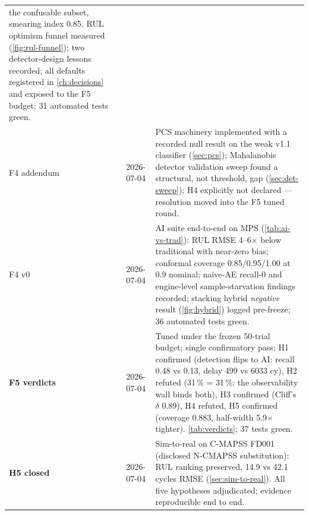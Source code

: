 \begin{table}[htbp]
\begin{tabular}{lp{}p{}}
      the confusable subset, smearing index 0.85, RUL optimism funnel measured
      (\cref{fig:rul-funnel}); two detector-design lessons recorded; all defaults registered
      in \cref{ch:decisions} and exposed to the F5 budget; 31 automated tests green. \\
    F4 addendum & 2026-07-04 & PCS machinery implemented with a
      recorded null result on the weak v1.1 classifier (\cref{sec:pcs}); Mahalanobis
      detector validation sweep found a structural, not threshold, gap
      (\cref{sec:det-sweep}); H4 explicitly not declared --- resolution moved into the F5
      tuned round. \\
    F4 v0 & 2026-07-04 & AI suite end-to-end on MPS (\cref{tab:ai-vs-trad}): RUL RMSE
      4--6$\times$ below traditional with near-zero bias; conformal coverage
      0.85/0.95/1.00 at 0.9 nominal; naive-AE recall-0 and engine-level sample-starvation
      findings recorded; stacking hybrid \emph{negative} result (\cref{fig:hybrid}) logged
      pre-freeze; 36 automated tests green. \\
    \textbf{F5 verdicts} & 2026-07-04 & Tuned under the frozen 50-trial budget; single
      confirmatory pass; H1 confirmed (detection flips to AI: recall 0.48 vs 0.13, delay
      499 vs 6033 cy), H2 refuted (31\,\% = 31\,\%: the observability wall binds both),
      H3 confirmed (Cliff's $\delta$ 0.89), H4 refuted, H5 confirmed (coverage 0.883,
      half-width 5.9$\times$ tighter). \cref{tab:verdicts}; 37 tests green. \\
    \textbf{H5 closed} & 2026-07-04 & Sim-to-real on C-MAPSS FD001 (disclosed N-CMAPSS
      substitution): RUL ranking preserved, 14.9 vs 42.1 cycles RMSE
      (\cref{sec:sim-to-real}). All five hypotheses adjudicated; evidence reproducible end
      to end. \\
    \bottomrule
  \end{tabular}
\end{table}
